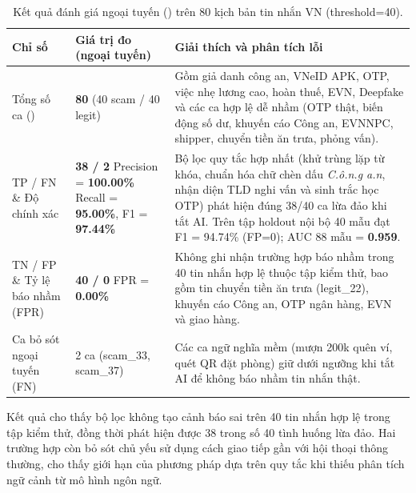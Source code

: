 \documentclass[10pt,a4paper]{article}
\newcommand{\code}[1]{\leavevmode{\normalfont\ttfamily\small #1}}
\newcommand{\codenobreak}[1]{\mbox{\normalfont\ttfamily\small #1}}
\begin{document}
\begin{table}[ht]
\centering
\caption{Kết quả đánh giá ngoại tuyến (\code{ai\_result=None}) trên 80 kịch bản tin nhắn VN (\codenobreak{threshold=40}).}
\footnotesize
\begin{tabularx}{\textwidth}{@{}L{3.5cm} L{3.7cm} Y@{}}
\toprule
\textbf{Chỉ số} & \textbf{Giá trị đo (ngoại tuyến)} & \textbf{Giải thích và phân tích lỗi} \\
\midrule
Tổng số ca (\code{total}) & \textbf{80} (40 scam / 40 legit) & Gồm giả danh công an, VNeID APK, OTP, việc nhẹ lương cao, hoàn thuế, EVN, Deepfake và các ca hợp lệ dễ nhầm (OTP thật, biến động số dư, khuyến cáo Công an, EVNNPC, shipper, chuyển tiền ăn trưa, phỏng vấn). \\
TP / FN \& Độ chính xác & \textbf{38 / 2} \newline Precision = \textbf{100.00\%} \newline Recall = \textbf{95.00\%}, F1 = \textbf{97.44\%} & Bộ lọc quy tắc hợp nhất (khử trùng lặp từ khóa, chuẩn hóa chữ chèn dấu \textit{C.ô.n.g a.n}, nhận diện TLD nghi vấn và sinh trắc học OTP) phát hiện đúng 38/40 ca lừa đảo khi tắt AI. Trên tập holdout nội bộ 40 mẫu đạt F1 = 94.74\% (FP=0); AUC 88 mẫu = \textbf{0.959}. \\
TN / FP \& Tỷ lệ báo nhầm (FPR) & \textbf{40 / 0} \newline FPR = \textbf{0.00\%} & Không ghi nhận trường hợp báo nhầm trong 40 tin nhắn hợp lệ thuộc tập kiểm thử, bao gồm tin chuyển tiền ăn trưa (\codenobreak{legit\_22}), khuyến cáo Công an, OTP ngân hàng, EVN và giao hàng. \\
Ca bỏ sót ngoại tuyến (FN) & 2 ca (\codenobreak{scam\_33}, \codenobreak{scam\_37}) & Các ca ngữ nghĩa mềm (mượn 200k quên ví, quét QR đặt phòng) giữ dưới ngưỡng khi tắt AI để không báo nhầm tin nhắn thật. \\
\bottomrule
\end{tabularx}
\end{table}

\noindent Kết quả cho thấy bộ lọc không tạo cảnh báo sai trên 40 tin nhắn hợp lệ trong tập kiểm thử, đồng thời phát hiện được 38 trong số 40 tình huống lừa đảo. Hai trường hợp còn bỏ sót chủ yếu sử dụng cách giao tiếp gần với hội thoại thông thường, cho thấy giới hạn của phương pháp dựa trên quy tắc khi thiếu phân tích ngữ cảnh từ mô hình ngôn ngữ.
\end{document}
